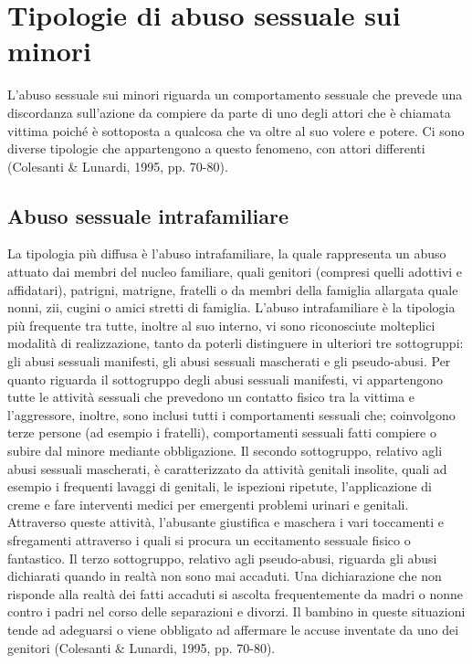 \section{Tipologie di abuso sessuale sui minori}
L’abuso sessuale sui minori riguarda un comportamento sessuale che prevede una discordanza sull’azione da compiere da parte di uno degli attori che è chiamata vittima poiché è sottoposta a qualcosa che va oltre al suo volere e potere. Ci sono diverse tipologie che appartengono a questo fenomeno, con attori differenti (Colesanti & Lunardi, 1995, pp. 70-80).
\subsection{Abuso sessuale intrafamiliare}
La tipologia più diffusa è l’abuso intrafamiliare, la quale rappresenta un abuso attuato dai membri del nucleo familiare, quali genitori (compresi quelli adottivi e affidatari), patrigni, matrigne, fratelli o da membri della famiglia allargata quale nonni, zii, cugini o amici stretti di famiglia. L’abuso intrafamiliare è la tipologia più frequente tra tutte, inoltre al suo interno, vi sono riconosciute molteplici modalità di realizzazione, tanto da poterli distinguere in ulteriori tre sottogruppi: gli abusi sessuali manifesti, gli abusi sessuali mascherati e gli pseudo-abusi. Per quanto riguarda il sottogruppo degli abusi sessuali manifesti, vi appartengono tutte le attività sessuali che prevedono un contatto fisico tra la vittima e l’aggressore, inoltre, sono inclusi tutti i comportamenti sessuali che; coinvolgono terze persone (ad esempio i fratelli), comportamenti sessuali fatti compiere o subire dal minore mediante obbligazione. Il secondo sottogruppo, relativo agli abusi sessuali mascherati, è caratterizzato da attività genitali insolite, quali ad esempio i frequenti lavaggi di genitali, le ispezioni ripetute, l’applicazione di creme e fare interventi medici per emergenti problemi urinari e genitali. Attraverso queste attività, l’abusante giustifica e maschera i vari toccamenti e sfregamenti attraverso i quali si procura un eccitamento sessuale fisico o fantastico. Il terzo sottogruppo, relativo agli pseudo-abusi, riguarda gli abusi dichiarati quando in realtà non sono mai accaduti. Una dichiarazione che non risponde alla realtà dei fatti accaduti si ascolta frequentemente da madri o nonne contro i padri nel corso delle separazioni e divorzi. Il bambino in queste situazioni tende ad adeguarsi o viene obbligato ad affermare le accuse inventate da uno dei genitori (Colesanti & Lunardi, 1995, pp. 70-80).
